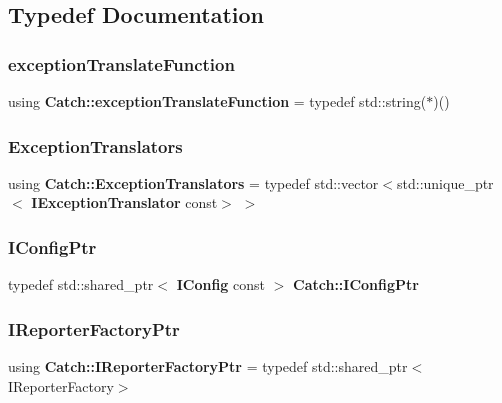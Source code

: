 \subsection{Typedef Documentation}
\mbox{\label{namespace_catch_ae8d8673884dc36b98875106322a2a37b}} 
\subsubsection{exceptionTranslateFunction}
{\footnotesize\ttfamily using \textbf{ Catch\+::exception\+Translate\+Function} = typedef std\+::string($\ast$)()}

\mbox{\label{namespace_catch_a7ad07967e688fdc03cf784f58be4b741}} 
\subsubsection{ExceptionTranslators}
{\footnotesize\ttfamily using \textbf{ Catch\+::\+Exception\+Translators} = typedef std\+::vector$<$std\+::unique\+\_\+ptr$<$\textbf{ I\+Exception\+Translator} const$>$ $>$}

\mbox{\label{namespace_catch_afd20a5d4f9d2f4d525db81a7765367b0}} 
\subsubsection{IConfigPtr}
{\footnotesize\ttfamily typedef std\+::shared\+\_\+ptr$<$ \textbf{ I\+Config} const  $>$ \textbf{ Catch\+::\+I\+Config\+Ptr}}

\mbox{\label{namespace_catch_ad1b36ac40c2739e52fd453dcdddf0d09}} 
\subsubsection{IReporterFactoryPtr}
{\footnotesize\ttfamily using \textbf{ Catch\+::\+I\+Reporter\+Factory\+Ptr} = typedef std\+::shared\+\_\+ptr$<$I\+Reporter\+Factory$>$}

\mbox{\label{namespace_catch_aba438977e831821a2eeca82b9b4f4af2}} 
